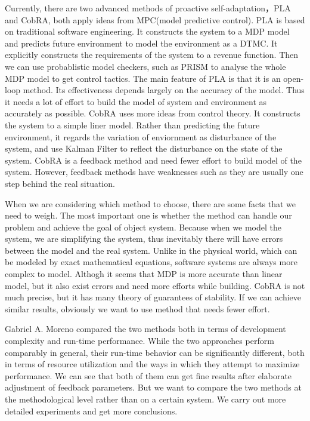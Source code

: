 \documentclass[sigconf]{acmart}
\begin{document}
Currently, there are two advanced methods of proactive self-adaptation，PLA and CobRA, both apply ideas from MPC(model predictive control). PLA is based on traditional software engineering. It constructs the system to a MDP model and predicts future environment to model the environment as a DTMC. It explicitly constructs the requirements of the system to a revenue  function. Then we can use probablistic model checkers, such as PRISM to analyse the whole MDP model to get control tactics. The main feature of PLA is that it is an open-loop method. Its effectiveness depends largely on the accuracy of the model. Thus it needs a lot of effort to build the model of system and environment as accurately as possible. CobRA uses more ideas from control theory. It constructs the system to a simple liner model. Rather than predicting the future environment, it regards the variation of enviornment as disturbance of the system, and use Kalman Filter to reflect the disturbance on the state of the system. CobRA is a feedback method and need fewer effort to build model of the system. However, feedback methods have weaknesses such as they are usually one step behind the real situation.

When we are considering which method to choose, there are some facts that we need to weigh. The most important one is whether the method can handle our problem and achieve the goal of object system. Because when we model the system, we are simplifying the system, thus inevitably there will have errors between the model and the real system. Unlike in the physical world, which can be modeled by exact mathematical equations, software systems are always more complex to model. Althogh it seems that MDP is more accurate than linear model, but it also exist errors and need more efforts while building. CobRA is not much precise, but it has many theory of guarantees of stability. If we can achieve similar results, obviously we want to use method that needs fewer effort.

Gabriel A. Moreno compared the two methods both in terms of development complexity and run-time performance. While the two approaches perform comparably in general, their run-time behavior can be significantly different, both in terms of resource utilization and the ways in which they attempt to maximize performance. We can see that both of them can get fine results after elaborate adjustment of feedback parameters. But we want to compare the two methods at the methodological level rather than on a certain system. We carry out more detailed experiments and get more conclusions.
\end{document}

